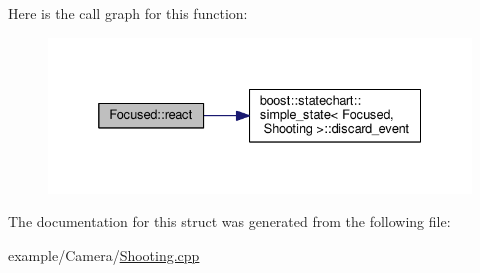 Here is the call graph for this function\+:
\nopagebreak
\begin{figure}[H]
\begin{center}
\leavevmode
\includegraphics[width=332pt]{struct_focused_a347f52c7524b336e5f2523f1ce6a1b42_cgraph}
\end{center}
\end{figure}


The documentation for this struct was generated from the following file\+:\begin{DoxyCompactItemize}
\item 
example/\+Camera/\mbox{\hyperlink{_shooting_8cpp}{Shooting.\+cpp}}\end{DoxyCompactItemize}
